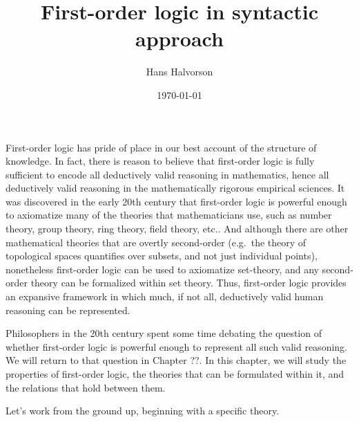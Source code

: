 \documentclass[11pt,fleqn]{article}
\title{First-order logic in syntactic approach}
\author{Hans Halvorson}
\date{\today}
\theoremstyle{definition}
\theoremstyle{remark}
\newcommand{\2}{\mathscr}
\newcounter{axi}\setcounter{axi}{0}
\begin{document}
\maketitle

First-order logic has pride of place in our best account of the
structure of knowledge.  In fact, there is reason to believe that
first-order logic is fully sufficient to encode all deductively valid
reasoning in mathematics, hence all deductively valid reasoning in the
mathematically rigorous empirical sciences.  It was discovered in the
early 20th century that first-order logic is powerful enough to
axiomatize many of the theories that mathematicians use, such as
number theory, group theory, ring theory, field theory, etc..  And
although there are other mathematical theories that are overtly
second-order (e.g.\ the theory of topological spaces quantifies over
subsets, and not just individual points), nonetheless first-order
logic can be used to axiomatize set-theory, and any second-order
theory can be formalized within set theory.  Thus, first-order logic
provides an expansive framework in which much, if not all, deductively
valid human reasoning can be represented.

Philosophers in the 20th century spent some time debating the question
of whether first-order logic is powerful enough to represent all such
valid reasoning.  We will return to that question in Chapter ??.  In
this chapter, we will study the properties of first-order logic, the
theories that can be formulated within it, and the relations that hold
between them.

Let's work from the ground up, beginning with a specific theory.
\end{document}
